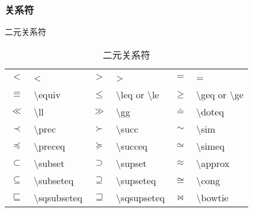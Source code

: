 \documentclass[a4paper]{ctexart}
\begin{document}
    \subsubsection{关系符}
    \centering    
    二元关系符\par
    \begin{table}
        \caption{二元关系符}
        \begin{tabular}{clclcl}
            \toprule
            $<$             & <                         & $>$           & >                                         & 
            $=$             & =                                                                                     \\
            $\equiv$        & \textbackslash equiv      & $\leq$        & \textbackslash leq or \textbackslash le   & 
        $\geq$          & \textbackslash geq or \textbackslash ge                                               \\
        $\ll$           & \textbackslash ll         & $\gg$         & \textbackslash gg                         & 
        $\doteq$        & \textbackslash doteq                                                                  \\
        $\prec$         & \textbackslash prec       & $\succ$       & \textbackslash succ                       &
        $\sim$          & \textbackslash sim                                                                    \\
        $\preceq$       & \textbackslash preceq     & $\succeq$     & \textbackslash succeq                     &
        $\simeq$        & \textbackslash simeq                                                                  \\
        $\subset$       & \textbackslash subset     & $\supset$     & \textbackslash supset                     &
        $\approx$       & \textbackslash approx                                                                 \\
        $\subseteq$     & \textbackslash subseteq   & $\supseteq$   & \textbackslash supseteq                   &
        $\cong$         & \textbackslash cong                                                                   \\
        $\sqsubseteq$   & \textbackslash sqsubseteq & $\sqsupseteq$ & \textbackslash sqsupseteq                 & 
        $\bowtie$       & \textbackslash bowtie                                                                 \\

\end{tabular}
\end{table}
\end{document}
